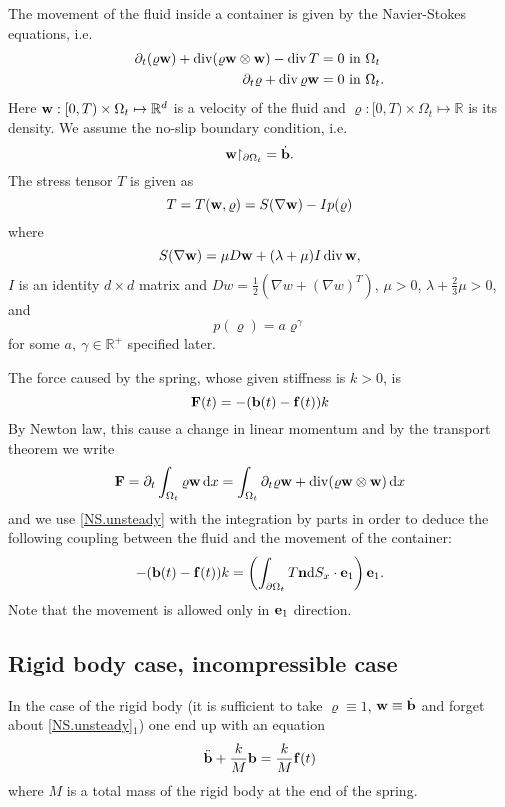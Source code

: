 \documentclass{article}
\DeclareMathOperator{\diver}{div}
\newcommand{\dx}{\,\mathrm{d}x}
\newcommand{\bb}{{\bf b}}
\newcommand{\be}{{\bf e}}
\newcommand{\ve}{\be}
\newcommand{\bw}{{\bf w}}
\newcommand{\vw}{\bw}
\newcommand{\bF}{{\bf F}}
\newcommand{\bn}{{\bf n}}
\newcommand{\pat}{\partial_t}
\numberwithin{equation}{section}
\begin{document}
The movement of the fluid inside a container is given by the Navier-Stokes equations, i.e.
\begin{equation}\label{NS.unsteady}
\begin{split}
\pat (\varrho \bw )  + \diver (\varrho \bw \otimes \bw) - \diver T & = 0 \ \mbox{in}\ \Omega_t\\
\pat \varrho + \diver \varrho \bw &= 0 \ \mbox{in}\ \Omega_t.
\end{split}
\end{equation}
Here $\bw:[0,T)\times \Omega_t\mapsto \mathbb R^d$ is a velocity of the fluid and $\varrho:[0,T)\times \Omega_t\mapsto \mathbb R$ is its density. We assume the no-slip boundary condition, i.e. 
\begin{equation*}%
\bw{\restriction_{\partial \Omega_t}} = \dot \bb.
\end{equation*}
The stress tensor $T$ is given as
\begin{equation}\label{stress.tensor}
T = T(\bw,\varrho) = S(\nabla \bw) - I p(\varrho)
\end{equation}
where 
\begin{equation}\label{deviatoric.stress}
S(\nabla \vw) = \mu D\bw +(\lambda +\mu)I \diver \bw,
\end{equation}
$I$ is an  identity $d\times d$ matrix and $Dw = \frac 12 \left(\nabla w + (\nabla w)^T\right)$, $\mu>0$, $\lambda + \frac 23 \mu>0$,
and
\begin{equation}\label{tlak}
p(\varrho) = a \varrho^\gamma
\end{equation}
for some $a,\ \gamma\in \mathbb R^+$ specified later.

The force caused by the spring, whose given stiffness is $k>0$, is 
$$
\bF(t) = -(\bb(t) - {\bf f}(t)) k
$$
By Newton law, this cause a change in linear momentum and by the transport theorem we write
$$
\bF = \partial_t\int_{\Omega_t} \varrho \bw \dx = \int_{\Omega_t} \pat \varrho \bw + \diver(\varrho \bw\otimes \bw)\dx
$$
and we use \eqref{NS.unsteady} with the integration by parts in order to deduce the following coupling between the fluid and the movement of the container:
\begin{equation*}%
-(\bb(t) - {\bf f}(t)) k = \left(\int_{\partial \Omega_t} T \bn {\rm d}S_x\cdot \ve_1\right) \ve_1.
\end{equation*}
Note that the movement is allowed only in $\ve_1$ direction.

\subsection{Rigid body case, incompressible case}%
In the case of the rigid body (it is sufficient to take $\varrho \equiv 1$, $\bw\equiv \dot \bb$ and forget about \eqref{NS.unsteady}$_1$) one end up with an equation
$$
\ddot \bb + \frac k M \bb = \frac kM {\bf f}(t)
$$
where $M$ is a total mass of the rigid body at the end of the spring.
\end{document}

